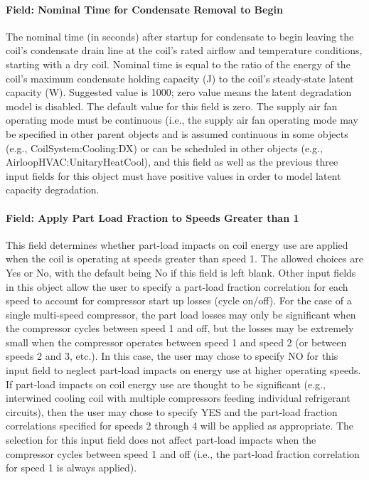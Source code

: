 \paragraph{Field: Nominal Time for Condensate Removal to Begin}

The nominal time (in seconds) after startup for condensate to begin leaving the coil's condensate drain line at the coil's rated airflow and temperature conditions, starting with a dry coil. Nominal time is equal to the ratio of the energy of the coil's maximum condensate holding capacity (J) to the coil's steady-state latent capacity (W). Suggested value is 1000; zero value means the latent degradation model is disabled. The default value for this field is zero. The supply air fan operating mode must be continuous (i.e., the supply air fan operating mode may be specified in other parent objects and is assumed continuous in some objects (e.g., CoilSystem:Cooling:DX) or can be scheduled in other objects (e.g., AirloopHVAC:UnitaryHeatCool), and this field as well as the previous three input fields for this object must have positive values in order to model latent capacity degradation.

\paragraph{Field: Apply Part Load Fraction to Speeds Greater than 1}

This field determines whether part-load impacts on coil energy use are applied when the coil is operating at speeds greater than speed 1. The allowed choices are Yes or No, with the default being No if this field is left blank. Other input fields in this object allow the user to specify a part-load fraction correlation for each speed to account for compressor start up losses (cycle on/off). For the case of a single multi-speed compressor, the part load losses may only be significant when the compressor cycles between speed 1 and off, but the losses may be extremely small when the compressor operates between speed 1 and speed 2 (or between speeds 2 and 3, etc.). In this case, the user may chose to specify NO for this input field to neglect part-load impacts on energy use at higher operating speeds. If part-load impacts on coil energy use are thought to be significant (e.g., interwined cooling coil with multiple compressors feeding individual refrigerant circuits), then the user may chose to specify YES and the part-load fraction correlations specified for speeds 2 through 4 will be applied as appropriate. The selection for this input field does not affect part-load impacts when the compressor cycles between speed 1 and off (i.e., the part-load fraction correlation for speed 1 is always applied).


